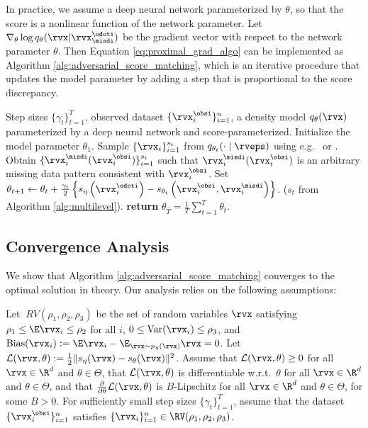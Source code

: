 In practice, we assume a deep neural network parameterized by $\theta$, so that the score is a nonlinear function of the network parameter. Let $\nabla_{\theta} \log q_{\theta}(\rvx | \rvx_{\misdi}^{\odoti})$ be the gradient vector with respect to the network parameter $\theta$. Then Equation \eqref{eq:proximal_grad_algo} can be implemented as Algorithm \ref{alg:adversarial_score_matching}, which is an iterative procedure that updates the model parameter by adding a step that is proportional to the score discrepancy.
\begin{algorithm}[tb]
	\caption{Adversarial Score Matching}
	\label{alg:adversarial_score_matching}
	\begin{algorithmic}[1]
		\REQUIRE Step sizes $\{\gamma_{t}\}_{t=1}^{T}$, observed dataset $\{\rvx_{i}^{\obsi}\}_{i=1}^{n}$, a density model $q_{\theta}(\rvx)$ parameterized by a deep neural network and score-parameterized.
		\STATE Initialize the model parameter $\theta_{1}$.
		\STATE Sample $\{\rvx_{i} \}_{i=1}^{s_{t}}$ from $q_{\theta_{t}}(\cdot \mid \rveps)$ using e.g.\ \citet{Ho2020} or \citet{Song2019}.
		\STATE Obtain $\{\rvx_{i}^{\misdi}(\rvx_{i}^{\obsi}) \}_{i=1}^{s_{t}}$ such that $\rvx_{i}^{\misdi}(\rvx_{i}^{\obsi})$ is an arbitrary missing data pattern consistent with $\rvx_{i}^{\obsi}$.
		\STATE Set $\theta_{t+1} \leftarrow \theta_{t} + \frac{\gamma_{t}}{2} \left\{ s_{\eta}\left(\rvx_{i}^{\odoti} \right) - s_{\theta_{t}} \left( \rvx_{i}^{\obsi}, \rvx_{i}^{\misdi} \right) \right\}$. ($s_{t}$ from Algorithm \ref{alg:multilevel}).
		\ENDFOR
		\STATE \textbf{return} $\theta_{\hat{T}}=\frac{1}{T} \sum_{t=1}^{T} \theta_{t}$.
	\end{algorithmic}
\end{algorithm}

\subsection{Convergence Analysis}
We show that Algorithm \ref{alg:adversarial_score_matching} converges to the optimal solution in theory. Our analysis relies on the following assumptions:
\begin{assumption}%
	\label{assumption1}
	Let $\ RV(\rho_{1}, \rho_{2}, \rho_{3})$ be the set of random variables $\rvx$ satisfying $\rho_{1} \leq \E \rvx_{i} \leq \rho_{2}$ for all $i$, $0 \leq \operatorname{Var}(\rvx_{i}) \leq \rho_{3}$, and $\operatorname{Bias}(\rvx_{i}) := \E \rvx_{i} - \E_{\rvx \sim p_{\eta}(\rvx)} \rvx = 0$.
	Let $\mathcal{L}(\rvx, \theta) := \frac{1}{2} \| s_{\eta}(\rvx) - s_{\theta}(\rvx) \|^2$. Assume that $\mathcal{L}(\rvx, \theta) \geq 0$ for all $\rvx \in \R^{d}$ and $\theta \in \Theta$, that $\mathcal{L}(\rvx, \theta)$ is differentiable w.r.t.\ $\theta$ for all $\rvx \in \R^{d}$ and $\theta \in \Theta$, and that $\frac{\partial}{\partial \theta} \mathcal{L}(\rvx, \theta)$ is $B$-Lipschitz for all $\rvx \in \R^{d}$ and $\theta \in \Theta$, for some $B > 0$. For sufficiently small step sizes $\{\gamma_{t}\}_{t=1}^{T}$, assume that the dataset $\{\rvx_{i}^{\obsi}\}_{i=1}^{n}$ satisfies $\{\rvx_{i}\}_{i=1}^{n} \in \RV(\rho_{1}, \rho_{2}, \rho_{3})$. 
\end{assumption}

